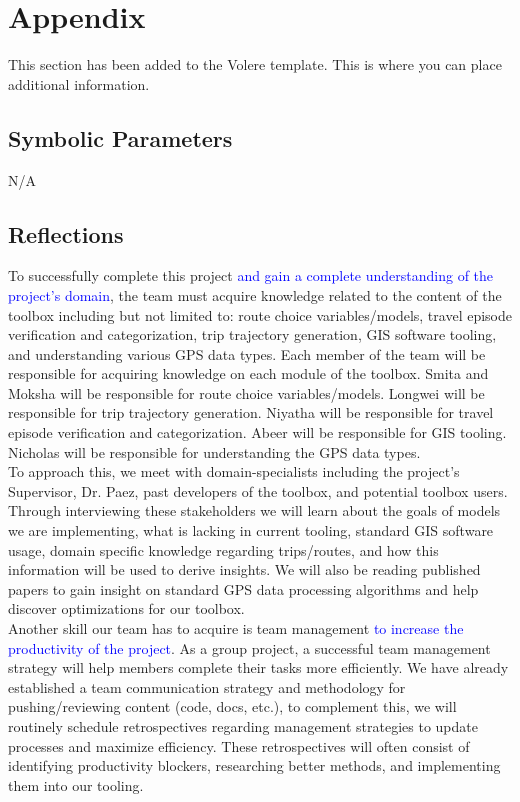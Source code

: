\documentclass[12pt, titlepage]{article}
\begin{document}
\newpage

\section{Appendix}
This section has been added to the Volere template.  This is where you can place
additional information.

\subsection{Symbolic Parameters}

N/A

\subsection{Reflections}

To successfully complete this project \textcolor{blue}{and gain a complete understanding of the project's domain}, the team must acquire knowledge related to the content of the toolbox including but not limited to: route choice variables/models, travel episode verification and categorization, trip trajectory generation, GIS software tooling, and understanding various GPS data types. Each member of the team will be responsible for acquiring knowledge on each module of the toolbox. Smita and Moksha will be responsible for route choice variables/models. Longwei will be responsible for trip trajectory generation. Niyatha will be responsible for travel episode verification and categorization. Abeer will be responsible for GIS tooling. Nicholas will be responsible for understanding the GPS data types.\\

\noident To approach this, we meet with domain-specialists including the project's Supervisor, Dr. Paez, past developers of the toolbox, and potential toolbox users. Through interviewing these stakeholders we will learn about the goals of models we are implementing, what is lacking in current tooling, standard GIS software usage, domain specific knowledge regarding trips/routes, and how this information will be used to derive insights. We will also be reading published papers to gain insight on standard GPS data processing algorithms and help discover optimizations for our toolbox.\\

\noindent Another skill our team has to acquire is team management \textcolor{blue}{to increase the productivity of the project}. As a group project, a successful team management strategy will help members complete their tasks more efficiently. We have already established a team communication strategy and methodology for pushing/reviewing content (code, docs, etc.), to complement this, we will routinely schedule retrospectives regarding management strategies to update processes and maximize efficiency. These retrospectives will often consist of identifying productivity blockers, researching better methods, and implementing them into our tooling. \\
\end{document}
